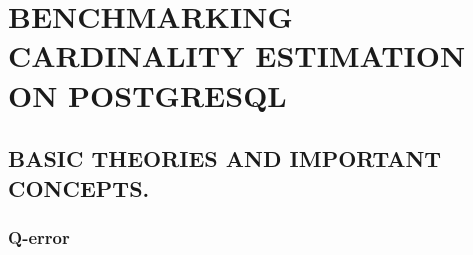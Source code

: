 
\chapter{BENCHMARKING CARDINALITY ESTIMATION ON POSTGRESQL}\label{chapter:Benchmarking CE}
\section{BASIC THEORIES AND IMPORTANT CONCEPTS.}
\subsection{Q-error}
